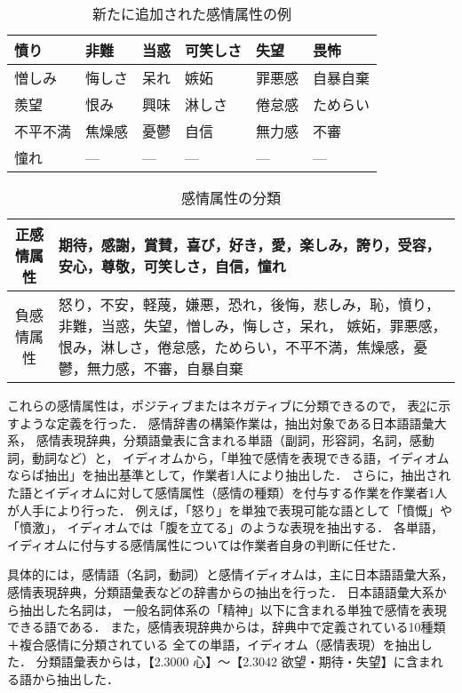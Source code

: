 \documentclass[japanese]{jnlp_1.3c}
\begin{document}
\begin{table}[b]
\begin{center}
\caption{新たに追加された感情属性の例}
\begin{tabular}{|p{1.4cm}|p{1.4cm}|p{1.4cm}|p{1.4cm}|p{1.4cm}|p{1.4cm}|} 
\hline
憤り & 非難 & 当惑 & 可笑しさ & 失望 & 畏怖 \\ \hline 
憎しみ & 悔しさ & 呆れ & 嫉妬 & 罪悪感 & 自暴自棄 \\ \hline
羨望 & 恨み & 興味 & 淋しさ & 倦怠感 & ためらい \\ \hline
不平不満 & 焦燥感 & 憂鬱 & 自信 & 無力感 & 不審 \\ \hline
憧れ & — & — & — & — & — \\ \hline
\end{tabular}
\label{tb:newema}
\end{center}
\end{table}
\begin{table}[b]
\begin{center}
\caption{感情属性の分類}
\begin{tabular}{|c|p{11.5cm}|}
\hline
正感情属性 & 期待，感謝，賞賛，喜び，好き，愛，楽しみ，誇り，受容，安心，尊敬，可笑しさ，自信，憧れ \\ \hline
負感情属性 & 怒り，不安，軽蔑，嫌悪，恐れ，後悔，悲しみ，恥，憤り，非難，当惑，失望，憎しみ，悔しさ，呆れ，
嫉妬，罪悪感，恨み，淋しさ，倦怠感，ためらい，不平不満，焦燥感，憂鬱，無力感，不審，自暴自棄  \\ \hline
\end{tabular}
\label{tb:emotion_pn}
\end{center}
\end{table}
これらの感情属性は，ポジティブまたはネガティブに分類できるので，
表\ref{tb:emotion_pn}に示すような定義を行った．
感情辞書の構築作業は，抽出対象である日本語語彙大系\cite{jlexicon}，
感情表現辞典\cite{Nakamura}，分類語彙表\cite{bunrui}に含まれる単語（副詞，形容詞，名詞，感動詞，動詞など）と，
イディオムから，「単独で感情を表現できる語，イディオムならば抽出」を抽出基準として，作業者1人により抽出した．
さらに，抽出された語とイディオムに対して感情属性（感情の種類）を付与する作業を作業者1人が人手により行った．
例えば，「怒り」を単独で表現可能な語として「憤慨」や「憤激」，
イディオムでは「腹を立てる」のような表現を抽出する．
各単語，イディオムに付与する感情属性については作業者自身の判断に任せた．

具体的には，感情語（名詞，動詞）と感情イディオムは，主に日本語語彙大系，
感情表現辞典，分類語彙表などの辞書からの抽出を行った．
日本語語彙大系から抽出した名詞は，
一般名詞体系の「精神」以下に含まれる単独で感情を表現できる語である．
また，感情表現辞典からは，辞典中で定義されている10種類＋複合感情に分類されている
全ての単語，イディオム（感情表現）を抽出した．
分類語彙表からは，【2.3000 心】〜【2.3042 欲望・期待・失望】に含まれる語から抽出した．
\end{document}
